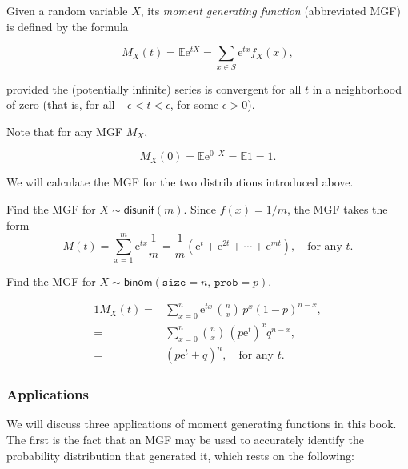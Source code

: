 \documentclass[]{book}
\numberwithin{equation}{chapter}
\numberwithin{figure}{chapter}
\theoremstyle{plain}
\theoremstyle{definition}
\theoremstyle{remark}
\theoremstyle{definition}
\theoremstyle{definition}
\theoremstyle{remark}
\let\BeginKnitrBlock\begin \let\EndKnitrBlock\end
\begin{document}
\BeginKnitrBlock{definition}
\protect\hypertarget{def:unnamed-chunk-214}{}{\label{def:unnamed-chunk-214}}Given
a random variable \(X\), its \emph{moment generating function}
(abbreviated MGF) is defined by the formula

\begin{equation}
M_{X}(t)=\mathbb{E}\mathrm{e}^{tX}=\sum_{x\in S}\mathrm{e}^{tx}f_{X}(x),
\end{equation}

provided the (potentially infinite) series is convergent for all \(t\)
in a neighborhood of zero (that is, for all
\(-\epsilon < t < \epsilon\), for some \(\epsilon > 0\)).
\EndKnitrBlock{definition}

Note that for any MGF \(M_{X}\),

\begin{equation}
M_{X}(0) = \mathbb{E} \mathrm{e}^{0 \cdot X} = \mathbb{E} 1 = 1.
\end{equation}

We will calculate the MGF for the two distributions introduced above.

\bigskip

\BeginKnitrBlock{example}
\protect\hypertarget{ex:unnamed-chunk-215}{}{\label{ex:unnamed-chunk-215}}Find
the MGF for \(X\sim\mathsf{disunif}(m)\). Since \(f(x) = 1/m\), the MGF
takes the form \[ M(t) = \sum_{x = 1}^{m} \mathrm{e}^{tx}
\frac{1}{m} = \frac{1}{m}(\mathrm{e}^{t} + \mathrm{e}^{2t} + \cdots +
\mathrm{e}^{mt}),\quad \mbox{for any $t$.}  \]
\EndKnitrBlock{example}

\bigskip

\BeginKnitrBlock{example}
\protect\hypertarget{ex:unnamed-chunk-216}{}{\label{ex:unnamed-chunk-216}}Find
the MGF for \(X\sim\mathsf{binom}(\mathtt{size}=n,\,\mathtt{prob}=p)\).
\EndKnitrBlock{example}

\begin{alignat*}{1}
M_{X}(t)= & \sum_{x=0}^{n}\mathrm{e}^{tx}\,{n \choose x}\, p^{x}(1-p)^{n-x},\\
= & \sum_{x=0}^{n}{n \choose x}\,(p\mathrm{e}^{t})^{x}q^{n-x},\\
= & (p\mathrm{e}^{t}+q)^{n},\quad \mbox{for any $t$.}
\end{alignat*}

\subsubsection{Applications}\label{applications}

We will discuss three applications of moment generating functions in
this book. The first is the fact that an MGF may be used to accurately
identify the probability distribution that generated it, which rests on
the following:
\end{document}
